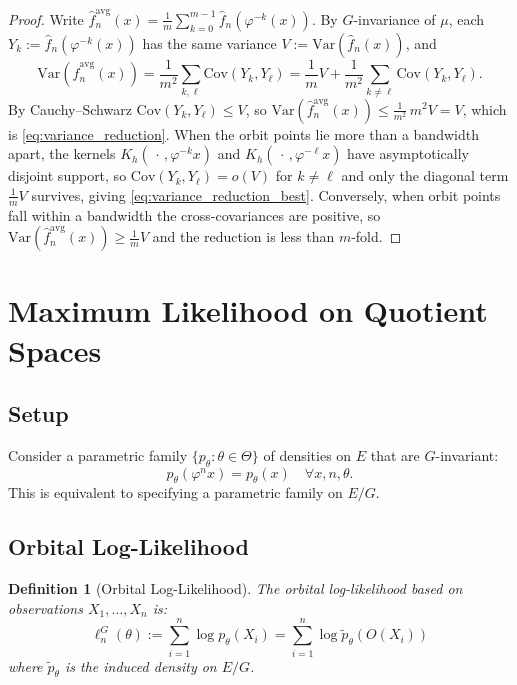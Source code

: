 \documentclass[11pt]{article}
\newtheorem{definition}[theorem]{Definition}
\newcommand{\Var}{\mathrm{Var}}
\newcommand{\Cov}{\mathrm{Cov}}
\begin{document}
\begin{proof}
Write $\hat{f}_n^{\mathrm{avg}}(x) = \frac{1}{m} \sum_{k=0}^{m-1} \hat{f}_n(\varphi^{-k}(x))$.
By $G$-invariance of $\mu$, each $Y_k := \hat{f}_n(\varphi^{-k}(x))$ has the same variance $V := \Var(\hat{f}_n(x))$, and
\begin{equation}
\Var(\hat{f}_n^{\mathrm{avg}}(x)) = \frac{1}{m^2} \sum_{k,\ell} \Cov(Y_k, Y_\ell)
= \frac{1}{m} V + \frac{1}{m^2} \sum_{k\neq\ell} \Cov(Y_k, Y_\ell).
\end{equation}
By Cauchy--Schwarz $\Cov(Y_k,Y_\ell)\le V$, so $\Var(\hat{f}_n^{\mathrm{avg}}(x))\le \frac{1}{m^2}\,m^2 V = V$, which is \eqref{eq:variance_reduction}. When the orbit points lie more than a bandwidth apart, the kernels $K_h(\,\cdot\,,\varphi^{-k}x)$ and $K_h(\,\cdot\,,\varphi^{-\ell}x)$ have asymptotically disjoint support, so $\Cov(Y_k,Y_\ell)=o(V)$ for $k\neq\ell$ and only the diagonal term $\frac{1}{m}V$ survives, giving \eqref{eq:variance_reduction_best}. Conversely, when orbit points fall within a bandwidth the cross-covariances are positive, so $\Var(\hat{f}_n^{\mathrm{avg}}(x))\ge\frac{1}{m}V$ and the reduction is less than $m$-fold.
\end{proof}

\section{Maximum Likelihood on Quotient Spaces}
\label{sec:mle}

\subsection{Setup}

Consider a parametric family $\{p_\theta : \theta \in \Theta\}$ of densities on $E$ that are $G$-invariant:
\begin{equation}\label{eq:invariant_family}
p_\theta(\varphi^n x) = p_\theta(x) \quad \forall x, n, \theta.
\end{equation}
This is equivalent to specifying a parametric family on $E/G$.

\subsection{Orbital Log-Likelihood}

\begin{definition}[Orbital Log-Likelihood]\label{def:orbital_likelihood}
The orbital log-likelihood based on observations $X_1, \ldots, X_n$ is:
\begin{equation}\label{eq:orbital_likelihood}
\ell_n^G(\theta) := \sum_{i=1}^n \log p_\theta(X_i) = \sum_{i=1}^n \log \tilde{p}_\theta(O(X_i))
\end{equation}
where $\tilde{p}_\theta$ is the induced density on $E/G$.
\end{definition}
\end{document}
